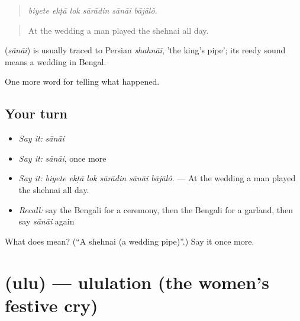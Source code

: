 \begin{quote}
     
\end{quote}

\begin{quote}
\emph{biyete ekṭā lok sārādin sānāi bājālô.}
\end{quote}

\begin{quote}
At the wedding a man played the shehnai all day.
\end{quote}

\begin{cousinweb}
\textbf{} (\emph{sānāi}) is usually traced to Persian \emph{shahnāī}, 'the king's pipe'; its reedy sound means a wedding in Bengal.
\end{cousinweb}

\begin{grammarlens}[title={What you've built}]
One more word for telling what happened.
\end{grammarlens}

\subsection*{Your turn}
\begin{itemize}
\raggedright
  \item \emph{Say it:} \emph{sānāi}
  \item \emph{Say it:} \emph{sānāi}, once more
  \item \emph{Say it:} \emph{biyete ekṭā lok sārādin sānāi bājālô.} — At the wedding a man played the shehnai all day.
  \item \emph{Recall:} say the Bengali for a ceremony, then the Bengali for a garland, then say \emph{sānāi} again
\end{itemize}

\begin{tcolorbox}[breakable,colback=teal!4,colframe=teal!35!black,title={Before you move on}]
What does  mean? (\textquotedblleft{}A shehnai (a wedding pipe)\textquotedblright{}.) Say it once more.
\end{tcolorbox}
\section[\texorpdfstring{\bn{উলু} (ulu)}{উলু (ulu)}]{ (ulu) — ululation (the women's festive cry)}

\label{lesson:BN-C312-ulu}




